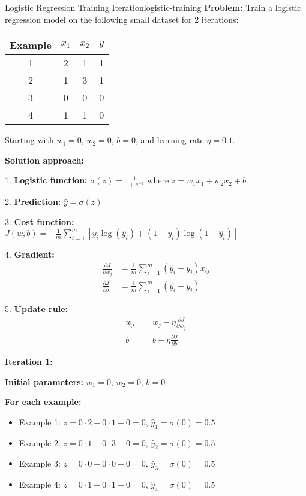 \documentclass[12pt]{article}
\begin{document}
\begin{example}{Logistic Regression Training Iteration}{logistic-training}
\textbf{Problem:} Train a logistic regression model on the following small dataset for 2 iterations:

\begin{center}
\begin{tabular}{|c|c|c|c|}
\hline
Example & $x_1$ & $x_2$ & $y$ \\
\hline
1 & 2 & 1 & 1 \\
2 & 1 & 3 & 1 \\
3 & 0 & 0 & 0 \\
4 & 1 & 1 & 0 \\
\hline
\end{tabular}
\end{center}

Starting with $w_1 = 0$, $w_2 = 0$, $b = 0$, and learning rate $\eta = 0.1$.

\textbf{Solution approach:}

1. \textbf{Logistic function:} $\sigma(z) = \frac{1}{1+e^{-z}}$ where $z = w_1x_1 + w_2x_2 + b$

2. \textbf{Prediction:} $\hat{y} = \sigma(z)$

3. \textbf{Cost function:} $J(w,b) = -\frac{1}{m}\sum_{i=1}^{m}[y_i\log(\hat{y}_i) + (1-y_i)\log(1-\hat{y}_i)]$

4. \textbf{Gradient:}
   \begin{align}
   \frac{\partial J}{\partial w_j} &= \frac{1}{m}\sum_{i=1}^{m}(\hat{y}_i - y_i)x_{ij} \\
   \frac{\partial J}{\partial b} &= \frac{1}{m}\sum_{i=1}^{m}(\hat{y}_i - y_i)
   \end{align}

5. \textbf{Update rule:}
   \begin{align}
   


      w_j &= w_j - \eta \frac{\partial J}{\partial w_j} \\
   b &= b - \eta \frac{\partial J}{\partial b}
   \end{align}

\textbf{Iteration 1:}

\textbf{Initial parameters:} $w_1 = 0$, $w_2 = 0$, $b = 0$

\textbf{For each example:}
\begin{itemize}
    \item Example 1: $z = 0 \cdot 2 + 0 \cdot 1 + 0 = 0$, $\hat{y}_1 = \sigma(0) = 0.5$
    \item Example 2: $z = 0 \cdot 1 + 0 \cdot 3 + 0 = 0$, $\hat{y}_2 = \sigma(0) = 0.5$
    \item Example 3: $z = 0 \cdot 0 + 0 \cdot 0 + 0 = 0$, $\hat{y}_3 = \sigma(0) = 0.5$
    \item Example 4: $z = 0 \cdot 1 + 0 \cdot 1 + 0 = 0$, $\hat{y}_4 = \sigma(0) = 0.5$
\end{itemize}


\end{example}
\end{document}
